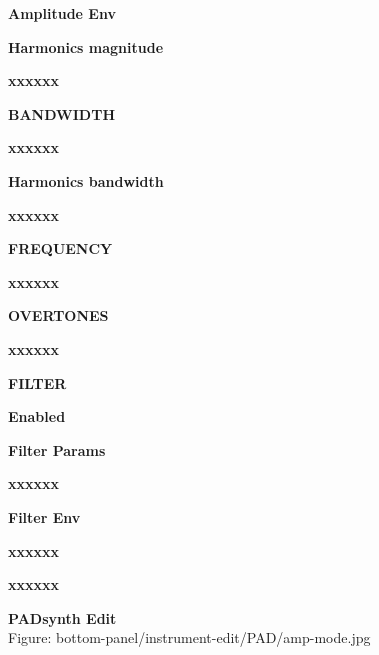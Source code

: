 \documentclass[
 11pt,
 twoside,
 a4paper,
 headinclude,
 footinclude,
 final                                 %
]{article}
\begin{document}
\begin{enumber}
\begin{enumber}
\begin{enumber}
            \item \textbf{Amplitude Env}
         \end{enumber}
         \item \textbf{Harmonics magnitude}
         \begin{enumber}
            \item \textbf{xxxxxx}
         \end{enumber}
         \item \textbf{BANDWIDTH}
         \begin{enumber}
            \item \textbf{xxxxxx}
         \end{enumber}
         \item \textbf{Harmonics bandwidth}
         \begin{enumber}
            \item \textbf{xxxxxx}
         \end{enumber}
         \item \textbf{FREQUENCY}
         \begin{enumber}
            \item \textbf{xxxxxx}
         \end{enumber}
         \item \textbf{OVERTONES}
         \begin{enumber}
            \item \textbf{xxxxxx}
         \end{enumber}
         \item \textbf{FILTER}
         \begin{enumber}
            \item \textbf{Enabled}
            \item \textbf{Filter Params}
            \begin{enumber}
               \item \textbf{xxxxxx}
            \end{enumber}
            \item \textbf{Filter Env}
            \begin{enumber}
               \item \textbf{xxxxxx}
            \end{enumber}
            \item \textbf{xxxxxx}
         \end{enumber}
      \item \textbf{PADsynth Edit} \\
         Figure: bottom-panel/instrument-edit/PAD/amp-mode.jpg \\

\end{enumber}
\end{enumber}
\end{document}
